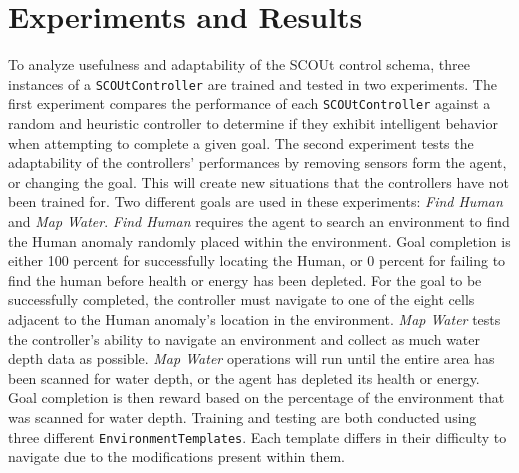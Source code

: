 

\chapter{Experiments and Results} \label{experiments_and_results}
To analyze usefulness and adaptability of the SCOUt control schema, three instances of a \texttt{SCOUtController} are trained and tested in two experiments.
The first experiment compares the performance of each \texttt{SCOUtController} against a random and heuristic controller to determine if they exhibit intelligent behavior when attempting to complete a given goal.
The second experiment tests the adaptability of the controllers' performances by removing sensors form the agent, or changing the goal.
This will create new situations that the controllers have not been trained for.
Two different goals are used in these experiments: \textit{Find Human} and \textit{Map Water}.
\textit{Find Human} requires the agent to search an environment to find the Human anomaly randomly placed within the environment.
Goal completion is either 100 percent for successfully locating the Human, or 0 percent for failing to find the human before health or energy has been depleted.
For the goal to be successfully completed, the controller must navigate to one of the eight cells adjacent to the Human anomaly's location in the environment. 
\textit{Map Water} tests the controller's ability to navigate an environment and collect as much water depth data as possible.
\textit{Map Water} operations will run until the entire area has been scanned for water depth, or the agent has depleted its health or energy.
Goal completion is then reward based on the percentage of the environment that was scanned for water depth.
Training and testing are both conducted using three different \texttt{EnvironmentTemplates}.
Each template differs in their difficulty to navigate due to the modifications present within them.


